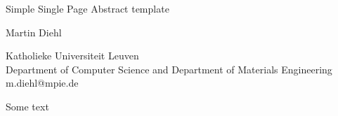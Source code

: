 \documentclass[a4paper]{article}
\begin{document}

\Large
 \begin{center}
Simple Single Page Abstract template\\ 

\hspace{10pt}

\large
Martin Diehl\\

\hspace{10pt}

\small  
Katholieke Universiteit Leuven\\Department of Computer Science and Department of Materials Engineering\\
m.diehl@mpie.de

\end{center}

\hspace{10pt}

\normalsize

Some text
\cite{Diehl2017}

\printbibliography 
\end{document}
